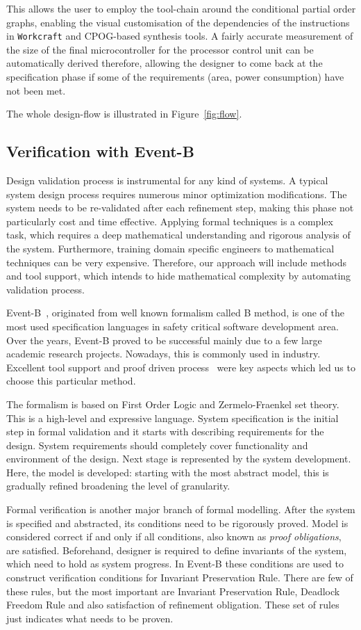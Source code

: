 \documentclass[conference]{IEEEtran}
\begin{document}
This allows the user to employ the tool-chain around the conditional partial order
graphs, enabling the visual customisation of the dependencies of the instructions in 
\verb|Workcraft| and CPOG-based synthesis tools. A fairly
accurate measurement of the size of the final microcontroller for the processor control
unit can be automatically derived therefore, allowing the designer to come back at the
specification phase if some of the requirements (area, power consumption) have not been
met.

The whole design-flow is illustrated in Figure~\ref{fig:flow}.

\subsection{Verification with Event-B}
\label{sec:ver}
Design validation process is instrumental for any kind of systems. A typical system design
process requires numerous minor optimization modifications. The system needs to be 
re-validated after each refinement step, making this phase not particularly cost and time
effective. Applying formal techniques is a complex task, which requires a deep mathematical
understanding and rigorous analysis of the system. Furthermore, training domain specific
engineers to mathematical techniques can be very expensive. Therefore, our approach will
include methods and tool support, which intends to hide mathematical complexity by automating
validation process. 

Event-B~\cite{eventbbook}, originated from well known formalism called B method, is one of the most used
specification languages in safety critical software development area. Over the years, Event-B
proved to be successful mainly due to a few large academic research projects. Nowadays, this
is commonly used in industry. Excellent tool support and proof driven process~\cite{summevent} 
were key aspects which led us to choose this particular method.

The formalism is based on First Order Logic and Zermelo-Fraenkel set theory. This is a
high-level and expressive language. System specification is the initial
step in formal validation and it starts with describing requirements for the design. System
requirements should completely cover functionality and environment of the design. Next stage
is represented by the system development. Here, the model is developed: starting with the most
abstract model, this is gradually refined broadening the level of granularity.

Formal verification is another major branch of formal modelling. After the system is
specified and abstracted, its conditions need to be rigorously proved. Model is considered
correct if and only if all conditions, also known as \textit{proof obligations}, are
satisfied. Beforehand, designer is required to define invariants of the system, which need to
hold as system progress. In Event-B these conditions are used to construct verification
conditions for Invariant Preservation Rule. There are few of these rules, but the most
important are Invariant Preservation Rule, Deadlock Freedom Rule and also satisfaction of
refinement obligation. These set of rules just indicates what needs to be proven.
\end{document}
